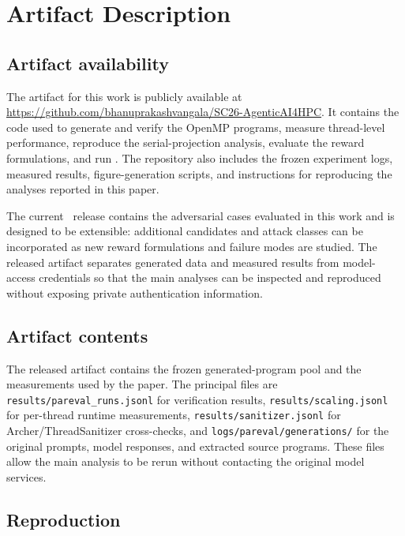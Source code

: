 \appendices

\section*{Artifact Description}

\subsection*{Artifact availability}

The artifact for this work is publicly available at
\url{https://github.com/bhanuprakashvangala/SC26-AgenticAI4HPC}. It contains the
code used to generate and verify the OpenMP programs, measure thread-level
performance, reproduce the serial-projection analysis, evaluate the reward
formulations, and run \PRB. The repository also includes the frozen experiment
logs, measured results, figure-generation scripts, and instructions for
reproducing the analyses reported in this paper.

The current \PRB\ release contains the adversarial cases evaluated in this work
and is designed to be extensible: additional candidates and attack classes can
be incorporated as new reward formulations and failure modes are studied. The
released artifact separates generated data and measured results from model-access
credentials so that the main analyses can be inspected and reproduced without
exposing private authentication information.

\subsection*{Artifact contents}

The released artifact contains the frozen generated-program pool and the
measurements used by the paper. The principal files are
\texttt{results/pareval\_runs.jsonl} for verification results,
\texttt{results/scaling.jsonl} for per-thread runtime measurements,
\texttt{results/sanitizer.jsonl} for Archer/ThreadSanitizer cross-checks, and
\texttt{logs/pareval/generations/} for the original prompts, model responses,
and extracted source programs. These files allow the main analysis to be rerun
without contacting the original model services.

\subsection*{Reproduction}

